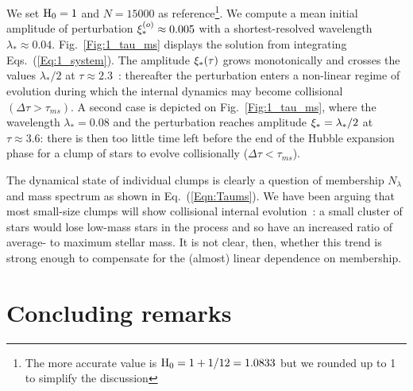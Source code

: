 We set ${\textrm{H}}_0 = 1$ and $N = 15 000$ as reference\footnote{The more accurate value is ${\textrm{H}}_0 = 1 + 1/12 = 1.0833$ but we rounded up to 1 to simplify the discussion}. We compute a mean initial amplitude of perturbation $\xi_\ast^{(o)} \approx 0.005 $ with a shortest-resolved wavelength $\lambda_\ast \approx 0.04$. Fig.~\ref{Fig:1_tau_ms} displays the solution from integrating Eqs.~(\ref{Eq:1_system}). The amplitude $\xi_\ast(\tau)$ grows monotonically and crosses the values $\lambda_\ast/2$ at $\tau \approx 2.3$~: thereafter the perturbation enters a non-linear regime of evolution during which the internal dynamics may become collisional $( \Delta\tau > \tau_{ms})$. A second case is depicted on Fig.~\ref{Fig:1_tau_ms}, where the wavelength $\lambda_\ast = 0.08$ and the perturbation reaches amplitude $\xi_\ast = \lambda_\ast/2$ at $\tau \approx 3.6$: there is then too little time left before the end of the Hubble expansion phase for a clump of stars to evolve collisionally ($\Delta\tau < \tau_{ms}$). 





The dynamical state of individual clumps is clearly a question of membership $N_\lambda$ and mass spectrum as shown in Eq.~(\ref{Eqn:Taums}). We have been arguing that most small-size clumps will show collisional internal evolution~: a small cluster of stars would lose low-mass stars in the process and so have an increased ratio of average-    to maximum stellar mass. It is not clear, then, whether this trend is strong enough to compensate for the (almost) linear dependence on membership. 





\section{Concluding remarks}

